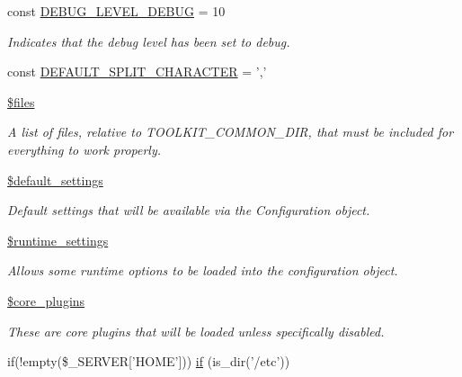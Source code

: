 \begin{DoxyCompactItemize}
const \hyperlink{common_8php_a081b2a8b4f0b1d1216fd2f143c8bc1a6}{D\-E\-B\-U\-G\-\_\-\-L\-E\-V\-E\-L\-\_\-\-D\-E\-B\-U\-G} = 10
\begin{DoxyCompactList}\small\item\em Indicates that the debug level has been set to debug. \end{DoxyCompactList}\item 
const \hyperlink{common_8php_a5fe77ccb49fee356e22cffa5a058e20d}{D\-E\-F\-A\-U\-L\-T\-\_\-\-S\-P\-L\-I\-T\-\_\-\-C\-H\-A\-R\-A\-C\-T\-E\-R} = ','
\item 
\hyperlink{common_8php_a9590b15215a21e9b42eb546aeef79704}{\$files}
\begin{DoxyCompactList}\small\item\em A list of files, relative to T\-O\-O\-L\-K\-I\-T\-\_\-\-C\-O\-M\-M\-O\-N\-\_\-\-D\-I\-R, that must be included for everything to work properly. \end{DoxyCompactList}\item 
\hyperlink{common_8php_a71d9864ceaa1b925fde0c8ea0f77abc3}{\$default\-\_\-settings}
\begin{DoxyCompactList}\small\item\em Default settings that will be available via the Configuration object. \end{DoxyCompactList}\item 
\hyperlink{common_8php_ab9492937f7a4246d6d6c94cc9688d7e2}{\$runtime\-\_\-settings}
\begin{DoxyCompactList}\small\item\em Allows some runtime options to be loaded into the configuration object. \end{DoxyCompactList}\item 
\hyperlink{common_8php_a9efe6b2fd5e0e018e9883090f254b25c}{\$core\-\_\-plugins}
\begin{DoxyCompactList}\small\item\em These are core plugins that will be loaded unless specifically disabled. \end{DoxyCompactList}\item 
if(!empty(\$\-\_\-\-S\-E\-R\-V\-E\-R\mbox{[}'H\-O\-M\-E'\mbox{]})) \hyperlink{common_8php_ab5cc02e0dea17e26d5401b25d28c71a5}{if} (is\-\_\-dir('/etc'))
\end{DoxyCompactItemize}



